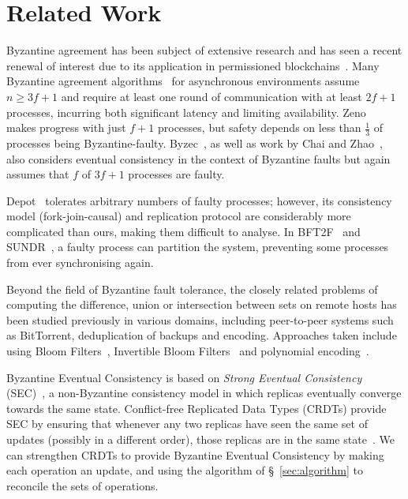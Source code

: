 \documentclass[a4paper,anonymous,USenglish]{lipics-v2019}
\begin{document}
\section{Related Work}

Byzantine agreement has been subject of extensive research and has seen a recent renewal of interest due to its application in permissioned blockchains~\cite{Bano:2019}.
Many Byzantine agreement algorithms~\cite{Castro:1999,Kotla:2007,Bessani:2014,Aublin:2015,Cowling:2006,Abd:2005} for asynchronous environments assume $n \ge 3f+1$ and require at least one round of communication with at least $2f+1$ processes, incurring both significant latency and limiting availability.
Zeno~\cite{Singh:2009} makes progress with just $f+1$ processes, but safety depends on less than $\frac{1}{3}$ of processes being Byzantine-faulty.
Byzec~\cite{Shoker:2017}, as well as work by Chai and Zhao~\cite{Chai:2014}, also considers eventual consistency in the context of Byzantine faults but again assumes that $f$ of $3f+1$ processes are faulty.

Depot~\cite{Mahajan:2011} tolerates arbitrary numbers of faulty processes; however, its consistency model (fork-join-causal) and replication protocol are considerably more complicated than ours, making them difficult to analyse.
In BFT2F~\cite{Li:2007} and SUNDR~\cite{Mazieres:2002}, a faulty process can partition the system, preventing some processes from ever synchronising again.

Beyond the field of Byzantine fault tolerance, the closely related problems of computing the difference, union or intersection between sets on remote hosts has been studied previously in various domains, including peer-to-peer systems such as BitTorrent, deduplication of backups and encoding.
Approaches taken include using Bloom Filters~\cite{Skjegstad:2011}, Invertible Bloom Filters~\cite{Goodrich:2011,Eppstein:2011} and polynomial encoding~\cite{Minsky:2006}.

Byzantine Eventual Consistency is based on \emph{Strong Eventual Consistency} (SEC)~\cite{Shapiro:2011}, a non-Byzantine consistency model in which replicas eventually converge towards the same state.
Conflict-free Replicated Data Types (CRDTs) provide SEC by ensuring that whenever any two replicas have seen the same set of updates (possibly in a different order), those replicas are in the same state~\cite{Shapiro:2011}.
We can strengthen CRDTs to provide Byzantine Eventual Consistency by making each operation an update, and using the algorithm of \S~\ref{sec:algorithm} to reconcile the sets of operations.
\end{document}
